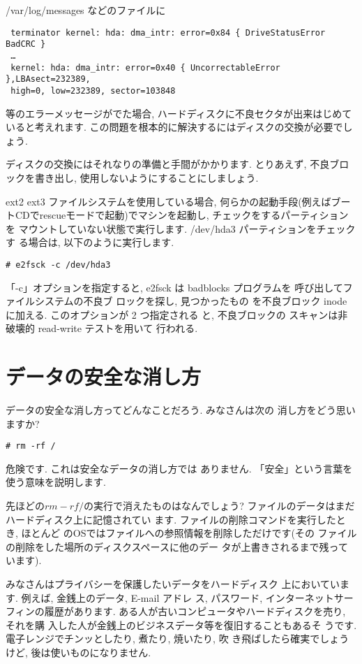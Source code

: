 \documentclass{jarticle}
\begin{document}
/var/log/messages などのファイルに

\begin{verbatim}
 terminator kernel: hda: dma_intr: error=0x84 { DriveStatusError BadCRC }
 …
 kernel: hda: dma_intr: error=0x40 { UncorrectableError },LBAsect=232389,
 high=0, low=232389, sector=103848 
\end{verbatim}
等のエラーメッセージがでた場合, ハードディスクに不良セクタが出来はじめて
いると考えれます. この問題を根本的に解決するにはディスクの交換が必要でし
ょう.

ディスクの交換にはそれなりの準備と手間がかかります. とりあえず, 不良ブロ
ックを書き出し, 使用しないようにすることにしましょう.

ext2 ext3 ファイルシステムを使用している場合, 何らかの起動手段(例えばブー
トCDでrescueモードで起動)でマシンを起動し, チェックをするパーティションを
マウントしていない状態で実行します. /dev/hda3 パーティションをチェックす
る場合は, 以下のように実行します.

\begin{verbatim}
# e2fsck -c /dev/hda3
\end{verbatim}
「-c」オプションを指定すると, e2fsck は badblocks プログラムを
呼び出してファイルシステムの不良ブ ロックを探し, 見つかったもの
を不良ブロック inode に加える. このオプションが 2 つ指定される
と, 不良ブロックの スキャンは非破壊的 read-write テストを用いて
行われる.

\section{データの安全な消し方}

データの安全な消し方ってどんなことだろう. みなさんは次の
消し方をどう思いますか?

\begin{verbatim}
# rm -rf /
\end{verbatim}
危険です. これは安全なデータの消し方では
ありません. 「安全」という言葉を使う意味を説明します.

先ほどの$rm -rf /$の実行で消えたものはなんでしょう?
ファイルのデータはまだハードディスク上に記憶されてい
ます. ファイルの削除コマンドを実行したとき, ほとんど
のOSではファイルへの参照情報を削除しただけです(その
ファイルの削除をした場所のディスクスペースに他のデー
タが上書きされるまで残っています).

みなさんはプライバシーを保護したいデータをハードディスク
上においています. 例えば, 金銭上のデータ, E-mail アドレ
ス, パスワード, インターネットサーフィンの履歴があります.
ある人が古いコンピュータやハードディスクを売り, それを購
入した人が金銭上のビジネスデータ等を復旧することもあるそ
うです. 電子レンジでチンッとしたり, 煮たり, 焼いたり, 吹
き飛ばしたら確実でしょうけど, 後は使いものになりません. 
\end{document}
